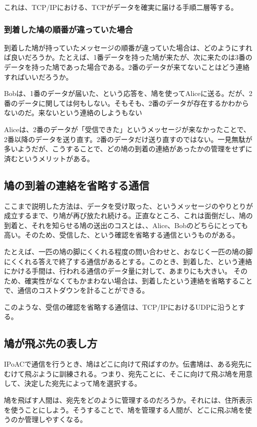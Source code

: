 これは、TCP/IPにおける、TCPがデータを確実に届ける手順二層等する。

\subsubsection{到着した鳩の順番が違っていた場合}
到着した鳩が持っていたメッセージの順番が違っていた場合は、どのようにすれば良いだろうか。たとえば、1番データを持った鳩が来たが、次に来たのは3番のデータを持った鳩であった場合である。2番のデータが来てないことはどう連絡すればいいだろうか。

Bobは、1番のデータが届いた、という応答を、鳩を使ってAliceに送る。だが、2番のデータに関しては何もしない。そもそも、2番のデータが存在するかわからないのだ。来ないという連絡のしようもない

Aliceは、2番のデータが「受信できた」というメッセージが来なかったことで、2番以降のデータを送り直す。2番のデータだけ送り直すのではない。一見無駄が多いようだが、こうすることで、どの鳩の到着の連絡があったかの管理をせずに済むというメリットがある。


\subsection{鳩の到着の連絡を省略する通信}
ここまで説明した方法は、データを受け取った、というメッセージのやりとりが成立するまで、り鳩が再び放たれ続ける。正直なところ、これは面倒だし、鳩の到着と、それを知らせる鳩の送出のコスとは、、Alice、Bobのどちらにとっても高い。そのため、受信した、という確認を省略する通信というものがある。

たとえば、一匹の鳩の脚にくくれる程度の問い合わせと、おなじく一匹の鳩の脚にくくれる答えで終了する通信があるとする。このとき、到着した、という連絡にかける手間は、行われる通信のデータ量に対して、あまりにも大きい。
そのため、確実性がなくてもかまわない場合は、到着したという連絡を省略することで、通信のコストダウンを計ることができる。

このような、受信の確認を省略する通信は、TCP/IPにおけるUDPに沿うとする。

\subsection{鳩が飛ぶ先の表し方}
IPoACで通信を行うとき、鳩はどこに向けて飛ばすのか。伝書鳩は、ある宛先にむけて飛ぶように訓練される。つまり、宛先ことに、そこに向けて飛ぶ鳩を用意して、決定した宛先によって鳩を選択する。

鳩を飛ばす人間は、宛先をどのように管理するのだろうか。それには、住所表示を使うことにしよう。そうすることで、鳩を管理する人間が、どこに飛ぶ鳩を使うのか管理しやすくなる。

